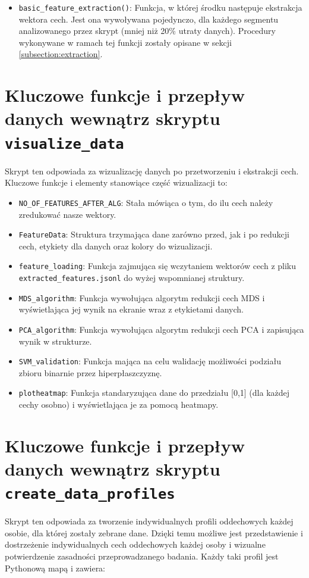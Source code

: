 \begin{itemize}
    \item \texttt{basic\_feature\_extraction()}: Funkcja, w której środku następuje ekstrakcja wektora cech.
    Jest ona wywoływana pojedynczo, dla każdego segmentu analizowanego przez skrypt (mniej niż 20\% utraty danych).
    Procedury wykonywane w ramach tej funkcji zostały opisane w sekcji \ref{subsection:extraction}.
\end{itemize}

\section{Kluczowe funkcje i przepływ danych wewnątrz skryptu \textnormal{\texttt{visualize\_data}}}
Skrypt ten odpowiada za wizualizację danych po przetworzeniu i ekstrakcji cech. Kluczowe funkcje i elementy
stanowiące część wizualizacji to:
\begin{itemize}
    \item \texttt{NO\_OF\_FEATURES\_AFTER\_ALG}:
        Stała mówiąca o tym, do ilu cech należy zredukować nasze wektory.
    \item \texttt{FeatureData}:
        Struktura trzymająca dane zarówno przed, jak i po redukcji cech, etykiety dla danych
        oraz kolory do wizualizacji.
    \item \texttt{feature\_loading}: Funkcja zajmująca się wczytaniem wektorów cech z pliku \texttt{extracted\_features.jsonl}
        do wyżej wspomnianej struktury.
    \item \texttt{MDS\_algorithm}:
        Funkcja wywołująca algorytm redukcji cech MDS i wyświetlająca jej wynik na ekranie wraz z etykietami danych.
    \item \texttt{PCA\_algorithm}:
        Funkcja wywołująca algorytm redukcji cech PCA i zapisująca wynik w strukturze.
    \item \texttt{SVM\_validation}: Funkcja mająca na celu walidację możliwości podziału zbioru binarnie przez
        hiperpłaszczyznę.
    \item \texttt{plotheatmap}: Funkcja standaryzująca dane do przedziału [0,1] (dla każdej cechy osobno) i
        wyświetlająca je za pomocą heatmapy.
\end{itemize}

\section{Kluczowe funkcje i przepływ danych wewnątrz skryptu \textnormal{\texttt{create\_data\_profiles}}}
Skrypt ten odpowiada za tworzenie indywidualnych profili oddechowych każdej osobie, dla której
zostały zebrane dane. Dzięki temu możliwe jest przedstawienie i dostrzeżenie
indywidualnych cech oddechowych każdej osoby i wizualne potwierdzenie zasadności przeprowadzanego
badania. Każdy taki profil jest Pythonową mapą i zawiera:

